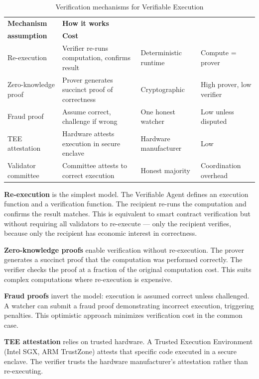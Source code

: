 \documentclass{article}
\begin{document}
\begin{table}[h]
    \centering
    \caption{Verification mechanisms for Verifiable Execution}
    \label{tab:verifexec}
    \begin{tabular}{p{3cm}p{4.5cm}p{3cm}p{3cm}}
        \toprule
        \textbf{Mechanism} & \textbf{How it works} & \makecell[l]{\textbf{Trust}\\\textbf{assumption}} & \textbf{Cost} \\
        \midrule
        Re-execution & Verifier re-runs computation, confirms result & Deterministic runtime & Compute = prover \\
        \addlinespace
        Zero-knowledge proof & Prover generates succinct proof of correctness & Cryptographic & High prover, low verifier \\
        \addlinespace
        Fraud proof & Assume correct, challenge if wrong & One honest watcher & Low unless disputed \\
        \addlinespace
        TEE attestation & Hardware attests execution in secure enclave & Hardware manufacturer & Low \\
        \addlinespace
        Validator committee & Committee attests to correct execution & Honest majority & Coordination overhead \\
        \bottomrule
    \end{tabular}
\end{table}

\textbf{Re-execution} is the simplest model. The Verifiable Agent defines an execution function and a verification function. The recipient re-runs the computation and confirms the result matches. This is equivalent to smart contract verification but without requiring all validators to re-execute  --- only the recipient verifies, because only the recipient has economic interest in correctness.

\textbf{Zero-knowledge proofs} enable verification without re-execution. The prover generates a succinct proof that the computation was performed correctly. The verifier checks the proof at a fraction of the original computation cost. This suits complex computations where re-execution is expensive.

\textbf{Fraud proofs} invert the model: execution is assumed correct unless challenged. A watcher can submit a fraud proof demonstrating incorrect execution, triggering penalties. This optimistic approach minimizes verification cost in the common case.

\textbf{TEE attestation} relies on trusted hardware. A Trusted Execution Environment (Intel SGX, ARM TrustZone) attests that specific code executed in a secure enclave. The verifier trusts the hardware manufacturer's attestation rather than re-executing.
\end{document}
